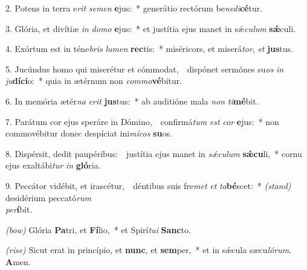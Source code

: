 2. Potens in terra e\textit{rit} \textit{se}\textit{men} \textbf{e}jus:~* 
	generátio rectórum be\textit{ne}\textit{di}\textbf{cé}tur.

3. Glória, et divítiæ \textit{in} \textit{do}\textit{mo} \textbf{e}jus:~* 
	et justítia ejus manet in s\'{\ae}\textit{cu}\textit{lum} \textbf{s\'{\ae}}culi.

4. Exórtum est in téne\textit{bris} \textit{lu}\textit{men} \textbf{rec}tis:~* 
	miséricors, et miserá\textit{tor}, \textit{et} \textbf{jus}tus.

5. Jucúndus homo qui miserétur et cómmodat,~{\color{red}\GreDagger}\ dispónet sermónes su\textit{os} \textit{in} \textit{ju}\textbf{dí}\textbf{ci}o:~* 
	quia in ætérnum non \textit{com}\textit{mo}\textbf{vé}bitur.

6. In memória ætér\textit{na} \textit{e}\textit{rit} \textbf{jus}tus:~* 
	ab auditióne mala \textit{non} \textit{ti}\textbf{mé}bit.

7. Parátum cor ejus speráre in Dómino,~{\color{red}\GreDagger}\ confirmá\textit{tum} \textit{est} \textit{cor} \textbf{e}jus:~* 
	non commovébitur donec despíciat ini\textit{mí}\textit{cos} \textbf{su}os.

8. Dispérsit, dedit paupéribus:~{\color{red}\GreDagger}\ justítia ejus manet in \textit{s\'{\ae}}\textit{cu}\textit{lum} \textbf{s\'{\ae}}\textbf{cu}li,~* 
	cornu ejus exaltábi\textit{tur} \textit{in} \textbf{gló}ria.

9. Peccátor vidébit, et irascétur,~{\color{red}\GreDagger}\ déntibus suis fre\textit{met} \textit{et} \textit{ta}\textbf{bé}scet:~* 
	{\color{red}\textit{(stand)}} desidérium peccató\textit{rum}\\ \textit{per}\textbf{í}bit.

{\color{red}\textit{(bow)}} Glória \textbf{Pa}tri, et \textbf{Fí}lio,~* 
	et Spirí\textit{tu}\textit{i} \textbf{Sanc}to.

{\color{red}\textit{(rise)}} Sicut erat in princípio, et \textbf{nunc}, et \textbf{sem}per,~* 
	et in s\'{\ae}cula sæcu\textit{ló}\textit{rum}. \textbf{A}men.